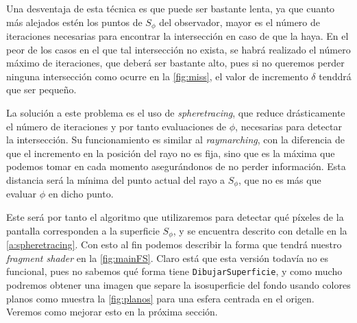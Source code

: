 Una desventaja de esta técnica es que puede ser bastante lenta, ya que cuanto más alejados estén los puntos de $S_\phi$ del observador, mayor es el número de iteraciones necesarias para encontrar la intersección en caso de que la haya. En el peor de los casos en el que tal intersección no exista, se habrá realizado el número máximo de iteraciones, que deberá ser bastante alto, pues si no queremos perder ninguna intersección como ocurre en la \autoref{fig:miss}, el valor de incremento $\delta$ tenddrá que ser pequeño.\newline

La solución a este problema es el uso de \textit{spheretracing}, que reduce drásticamente el número de iteraciones y por tanto evaluaciones de $\phi$, necesarias para detectar la intersección. Su funcionamiento es similar al \textit{raymarching}, con la diferencia de que el incremento en la posición del rayo no es fija, sino que es la máxima que podemos tomar en cada momento asegurándonos de no perder información. Esta distancia será la mínima del punto actual del rayo a $S_\phi$, que no es más que evaluar $\phi$ en dicho punto.\newline

Este será por tanto el algoritmo que utilizaremos para detectar qué píxeles de la pantalla corresponden a la superficie $S_{\phi}$, y se encuentra descrito con detalle en la \autoref{a:spheretracing}. 
Con esto al fin podemos describir la forma que tendrá nuestro \textit{fragment shader} en la \autoref{fig:mainFS}. Claro está que esta versión todavía no es funcional, pues no sabemos qué forma tiene \texttt{DibujarSuperficie}, y como mucho podremos obtener una imagen que separe la isosuperficie del fondo usando colores planos como muestra la \autoref{fig:planos} para una esfera centrada en el origen. Veremos como mejorar esto en la próxima sección.

